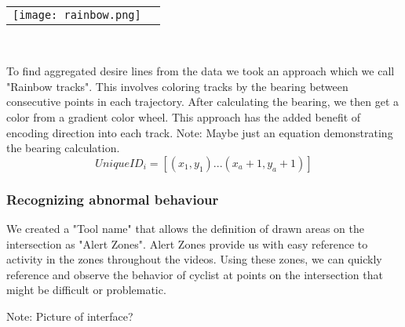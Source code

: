 \ \\ 
\noindent
\begin{tabular}{@{}cc}
\texttt{[image: rainbow.png]} 
\end{tabular}
\label{Rainbow}
\

To find aggregated desire lines from the data we took an approach which we call "Rainbow tracks". This involves coloring tracks by the bearing between consecutive points in each trajectory. After calculating the bearing, we then get a color from a gradient color wheel. This approach has the added benefit of encoding direction into 
each track.
Note: Maybe just an equation demonstrating the bearing calculation.
\ \\ 

\begin{equation}
  UniqueID_i = [(x_1, y_1)...(x_a+1, y_a+1)]\label{eq:3}
\end{equation}

\subsubsection{Recognizing abnormal behaviour}

We created a "Tool name" that allows the definition of drawn areas on the intersection as "Alert Zones". 
Alert Zones provide us with easy reference to activity in the zones throughout the videos. 
Using these zones, we can quickly reference and observe the behavior of cyclist at points on the 
intersection that might be difficult or problematic.

Note: Picture of interface?